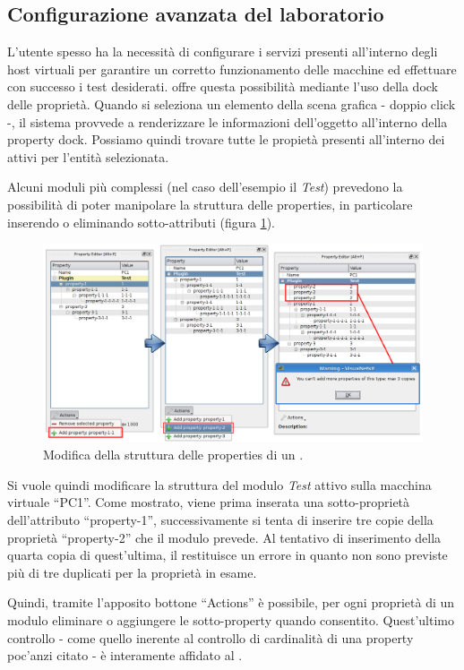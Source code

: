 \subsection{Configurazione avanzata del laboratorio}
L'utente spesso ha la necessità di configurare i servizi presenti all'interno degli host virtuali per garantire un corretto funzionamento delle macchine ed effettuare con successo i test desiderati. \visualnetkit{} offre questa possibilità mediante l'uso della dock delle proprietà.
Quando si seleziona un elemento della scena grafica - doppio click -, il sistema provvede a renderizzare le informazioni dell'oggetto all'interno della property dock. Possiamo quindi trovare tutte le propietà presenti all'interno dei \plugin{} attivi per l'entità selezionata.

Alcuni moduli più complessi (nel caso dell'esempio il \plugin{} \emph{Test}) prevedono la possibilità di poter manipolare la struttura delle properties, in particolare inserendo o eliminando sotto-attributi (figura \ref{figura:vn_ex_pp}).

\begin{figure}[!htb]
	\centering
	\includegraphics[width=13cm]{images/vnetkit_property_evolution.png}
	\caption{Modifica della struttura delle properties di un \plugin{}.}
	\label{figura:vn_ex_pp}
\end{figure}
Si vuole quindi modificare la struttura del modulo \emph{Test} attivo sulla macchina virtuale ``PC1''. Come mostrato, viene prima inserata una sotto-proprietà dell'attributo ``property-1'', successivamente si tenta di inserire tre copie della proprietà ``property-2'' che il modulo prevede.
Al tentativo di inserimento della quarta copia di quest'ultima, il \plugin{} restituisce un errore in quanto non sono previste più di tre duplicati per la proprietà in esame.

Quindi, tramite l'apposito bottone ``Actions'' è possibile, per ogni proprietà di un modulo eliminare o aggiungere le sotto-property quando consentito. Quest'ultimo controllo - come quello inerente al controllo di cardinalità di una property poc'anzi citato - è interamente affidato al \plugin{}.

